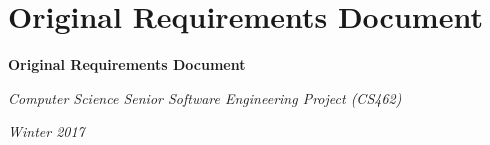 \newpage
\section{Original Requirements Document}
\def\RDtitle{Computer Science Senior Software Engineering Project (CS462)}
\def\RDversion{2.0}
\def\RDterm{Winter 2017}

	\centering
	\vspace{\fill}

	{\Huge\bfseries Original Requirements Document\par}
	\vspace{0.5cm}
	{\Large\itshape \RDtitle\par}
	\vspace{0.5cm}
	{\Large\itshape \RDterm\par}
	
	\vspace{\fill}
	
	\begin{abstract}
	We are working with Rockwell Collins to explore potential technological innovations relating to their Head-Up Display (HUD) systems that present critical flight information to pilots. Our primary objective is to improve Rockwell Collins current HUD systems by reducing the cost and time required to precisely align flight information to the HUD. To meet our objective we will look into using a new alignment methodology in conjunction with the current HUD system as a proof of concept. The product being developed is a demonstration system that looks to include a MEMS IRU mounted onto the HUD and a new alignment algorithm that utilizes this additional sensor to determine accurate HUD alignment. This document will introduce the specific details of the demonstration system and describe the requirements for the development of the product.
	\end{abstract}
	
	